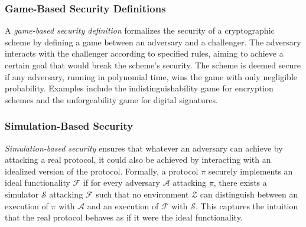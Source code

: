 \documentclass{iacrcc}
\begin{document}
\subsubsection{Game-Based Security Definitions}

A \textit{game-based security definition} formalizes the security of a cryptographic scheme by defining a game between an adversary and a challenger. The adversary interacts with the challenger according to specified rules, aiming to achieve a certain goal that would break the scheme's security. The scheme is deemed secure if any adversary, running in polynomial time, wins the game with only negligible probability. Examples include the indistinguishability game for encryption schemes and the unforgeability game for digital signatures.

\subsubsection{Simulation-Based Security}

\textit{Simulation-based security} ensures that whatever an adversary can achieve by attacking a real protocol, it could also be achieved by interacting with an idealized version of the protocol. Formally, a protocol $\pi$ securely implements an ideal functionality $\mathcal{F}$ if for every adversary $\mathcal{A}$ attacking $\pi$, there exists a simulator $\mathcal{S}$ attacking $\mathcal{F}$ such that no environment $\mathcal{Z}$ can distinguish between an execution of $\pi$ with $\mathcal{A}$ and an execution of $\mathcal{F}$ with $\mathcal{S}$. This captures the intuition that the real protocol behaves as if it were the ideal functionality.
\end{document}
